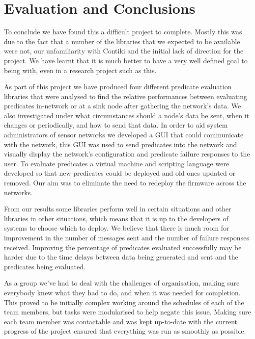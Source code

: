 \section{Evaluation and Conclusions}

To conclude we have found this a difficult project to complete. Mostly this was due to the fact that a number of the libraries that we expected to be available were not, our unfamiliarity with Contiki and the initial lack of direction for the project. We have learnt that it is much better to have a very well defined goal to being with, even in a research project such as this.

As part of this project we have produced four different predicate evaluation libraries that were analysed to find the relative performances between evaluating predicates in-network or at a sink node after gathering the network's data. We also investigated under what circumstances should a node's data be sent, when it changes or periodically, and how to send that data. In order to aid system administrators of sensor networks we developed a GUI that could communicate with the network, this GUI was used to send predicates into the network and visually display the network's configuration and predicate failure responses to the user. To evaluate predicates a virtual machine and scripting language were developed so that new predicates could be deployed and old ones updated or removed. Our aim was to eliminate the need to redeploy the firmware across the networks.

From our results some libraries perform well in certain situations and other libraries in other situations, which means that it is up to the developers of systems to choose which to deploy. We believe that there is much room for improvement in the number of messages sent and the number of failure responses received. Improving the percentage of predicates evaluated successfully may be harder due to the time delays between data being generated and sent and the predicates being evaluated.

As a group we've had to deal with the challenges of organisation, making sure everybody knew what they had to do, and when it was needed for completion. This proved to be initially complex working around the schedules of each of the team members, but tasks were modularised to help negate this issue. Making sure each team member was contactable and was kept up-to-date with the current progress of the project ensured that everything was run as smoothly as possible. 


